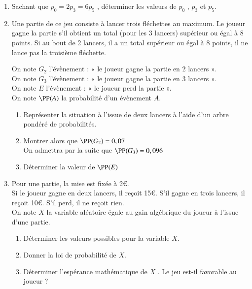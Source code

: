\documentclass[oneside,12pt]{article}
\begin{document}
\begin{enumerate}
	\item Sachant que $p_0=2p_3=6p_5$ , déterminer les valeurs de $p_0$ , $p_3$ et $p_5$.
	\item Une partie de ce jeu consiste à lancer trois fléchettes au maximum. Le joueur gagne la partie s’il obtient un total (pour les 3 lancers) supérieur ou égal à 8 points. Si au bout de 2 lancers, il a un total supérieur ou égal à 8 points, il ne lance pas la troisième fléchette.
	
	On note $G_2$ l’évènement : « le joueur gagne la partie en 2 lancers ».\\
	On note $G_3$ l’évènement : « le joueur gagne la partie en 3 lancers ».\\
	On note $E$ l’évènement : « le joueur perd la partie ».\\
	On note $\PP(A)$ la probabilité d’un évènement $A$.
	\begin{enumerate}
		\item Représenter la situation à l'issue de deux lancers à l'aide d'un arbre pondéré de probabilités.
		\item Montrer alors que $\PP(G_2)=0,07$ \\
		On admettra par la suite que $\PP(G_3)=0,096$
		\item Déterminer la valeur de $\PP(E)$
	\end{enumerate}
	\item Pour une partie, la mise est fixée à 2\euro. \\
	Si le joueur gagne en deux lancers, il reçoit 15\euro. S’il gagne en trois lancers, il reçoit 10\euro. S’il perd, il ne reçoit rien. \\
	On note $X$ la variable aléatoire égale au gain algébrique du joueur à l'issue d'une partie.
	\begin{enumerate}
		\item Déterminer les valeurs possibles pour la variable $X$.
		\item Donner la loi de probabilité de $X$.
		\item Déterminer l’espérance mathématique de $X$ . Le jeu est-il favorable au joueur ?
	\end{enumerate}
\end{enumerate}





\newpage
\end{document}
